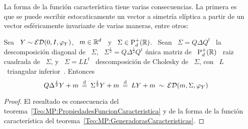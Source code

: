 La forma de la funci\'on caracter\'istica tiene varias consecuencias. La primera
es que  se puede  escribir estocaticamente un  vector a simetr\'ia  el\'iptica a
partir de un vector esf\'ericamente invariante de varias maneras, entre otros:
%
\begin{corolario}
  Sea  \ $Y  \sim  \mathcal{ED}(0,I,\varphi_Y)$, \  $m \in  \mathbb{R}^d$  \ y  \ $\Sigma  \in
  \mathrm{P}_d^+(\mathbb{R})$.  \ Sean  \ $\Sigma  = Q  \Delta Q^t$  \  la descomposici\'on
  diagonal de \ $\Sigma$, \  $\Sigma^{\frac12} = Q \Delta^{\frac12} Q^t$ \'unica
  matriz de \ $\mathrm{P}_d^+(\mathbb{R})$  \ raiz cuadrada de \ $\Sigma$, y  \ $\Sigma = L
  L^t$ \  descomposici\'on de  Cholesky de  \ $\Sigma$, con  \ $L$  \ triangular
  inferior~\cite{HorJoh13, Bha07}.  Entonces
  \[
  Q \Delta^{\frac12} Y + m \: \stackrel{\mathrm{d}}{=} \:  \Sigma^{\frac12} Y + m \: \stackrel{\mathrm{d}}{=} \: L Y
  + m \: \sim \: \mathcal{ED}(m,\Sigma,\varphi_Y)
  \]
\end{corolario}
%
\begin{proof}
  El             resultado            es             consecuencia            del
  teorema~\ref{Teo:MP:PropiedadesFuncionCaracteristica}  y  de  la forma  de  la
  funci\'on caracter\'istica del teorema~\ref{Teo:MP:GeneradorasCaracteristicas}.
\end{proof}

